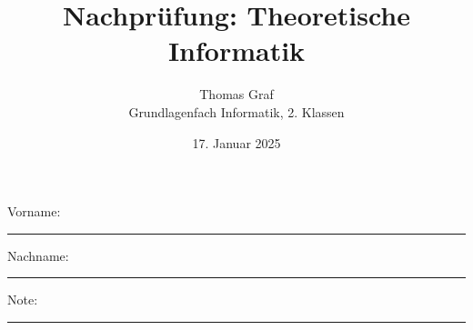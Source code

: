 \newtoggle{withbonus} \togglefalse{withbonus} %

\newcommand{\mycourse}{Grundlagenfach Informatik}
\newcommand{\myclass}{2. Klassen}
\newcommand{\mydate}{17. Januar 2025}

\title{\textbf{Nachprüfung: Theoretische Informatik}}
\author{Thomas Graf\\
	\mycourse, \myclass}
\date{\mydate}
\maketitle
\thispagestyle{headandfoot}

\begin{center}
\end{center}
\vspace{10mm}

\begin{center}
	Vorname: \rule{45mm}{0.8pt}\qquad Nachname: \rule{45mm}{0.8pt}
\end{center}
\vspace{20mm}

\begin{center}
	\iftoggle{withbonus} {
		\combinedgradetable[h][questions]
	} {
		\gradetable[h][questions]
	}
\end{center}
\vspace{15mm}
\begin{center}
	Note:
	\vspace{10mm}

	\rule{8mm}{1.2pt}
\end{center}
\clearpage

